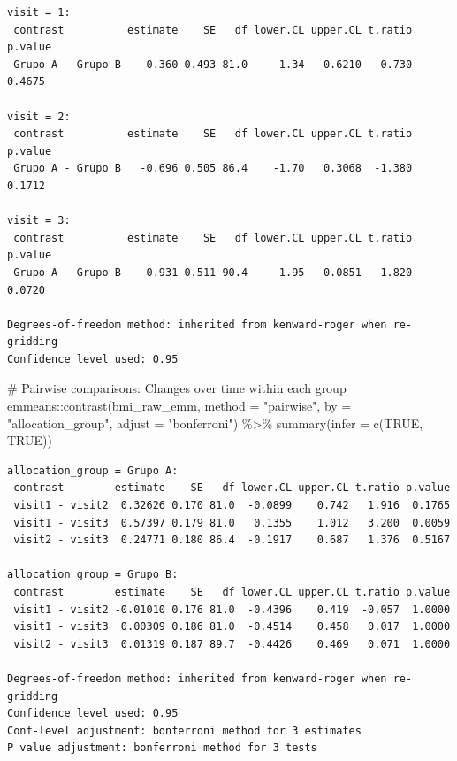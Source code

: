 \documentclass[
  letterpaper,
  DIV=11,
  numbers=noendperiod]{scrartcl}
\newenvironment{Shaded}{\begin{snugshade}}{\end{snugshade}}
\newcommand{\AttributeTok}[1]{\textcolor[rgb]{0.40,0.45,0.13}{#1}}
\newcommand{\CommentTok}[1]{\textcolor[rgb]{0.37,0.37,0.37}{#1}}
\newcommand{\ConstantTok}[1]{\textcolor[rgb]{0.56,0.35,0.01}{#1}}
\newcommand{\FunctionTok}[1]{\textcolor[rgb]{0.28,0.35,0.67}{#1}}
\newcommand{\NormalTok}[1]{\textcolor[rgb]{0.00,0.23,0.31}{#1}}
\newcommand{\SpecialCharTok}[1]{\textcolor[rgb]{0.37,0.37,0.37}{#1}}
\newcommand{\StringTok}[1]{\textcolor[rgb]{0.13,0.47,0.30}{#1}}
\begin{document}
\begin{verbatim}
visit = 1:
 contrast          estimate    SE   df lower.CL upper.CL t.ratio p.value
 Grupo A - Grupo B   -0.360 0.493 81.0    -1.34   0.6210  -0.730  0.4675

visit = 2:
 contrast          estimate    SE   df lower.CL upper.CL t.ratio p.value
 Grupo A - Grupo B   -0.696 0.505 86.4    -1.70   0.3068  -1.380  0.1712

visit = 3:
 contrast          estimate    SE   df lower.CL upper.CL t.ratio p.value
 Grupo A - Grupo B   -0.931 0.511 90.4    -1.95   0.0851  -1.820  0.0720

Degrees-of-freedom method: inherited from kenward-roger when re-gridding 
Confidence level used: 0.95 
\end{verbatim}

\begin{Shaded}
\begin{Highlighting}[]
\CommentTok{\# Pairwise comparisons: Changes over time within each group}
\NormalTok{emmeans}\SpecialCharTok{::}\FunctionTok{contrast}\NormalTok{(bmi\_raw\_emm, }\AttributeTok{method =} \StringTok{"pairwise"}\NormalTok{, }\AttributeTok{by =} \StringTok{"allocation\_group"}\NormalTok{, }\AttributeTok{adjust =} \StringTok{"bonferroni"}\NormalTok{) }\SpecialCharTok{\%\textgreater{}\%} \FunctionTok{summary}\NormalTok{(}\AttributeTok{infer =} \FunctionTok{c}\NormalTok{(}\ConstantTok{TRUE}\NormalTok{, }\ConstantTok{TRUE}\NormalTok{))}
\end{Highlighting}
\end{Shaded}

\begin{verbatim}
allocation_group = Grupo A:
 contrast        estimate    SE   df lower.CL upper.CL t.ratio p.value
 visit1 - visit2  0.32626 0.170 81.0  -0.0899    0.742   1.916  0.1765
 visit1 - visit3  0.57397 0.179 81.0   0.1355    1.012   3.200  0.0059
 visit2 - visit3  0.24771 0.180 86.4  -0.1917    0.687   1.376  0.5167

allocation_group = Grupo B:
 contrast        estimate    SE   df lower.CL upper.CL t.ratio p.value
 visit1 - visit2 -0.01010 0.176 81.0  -0.4396    0.419  -0.057  1.0000
 visit1 - visit3  0.00309 0.186 81.0  -0.4514    0.458   0.017  1.0000
 visit2 - visit3  0.01319 0.187 89.7  -0.4426    0.469   0.071  1.0000

Degrees-of-freedom method: inherited from kenward-roger when re-gridding 
Confidence level used: 0.95 
Conf-level adjustment: bonferroni method for 3 estimates 
P value adjustment: bonferroni method for 3 tests 
\end{verbatim}
\end{document}
